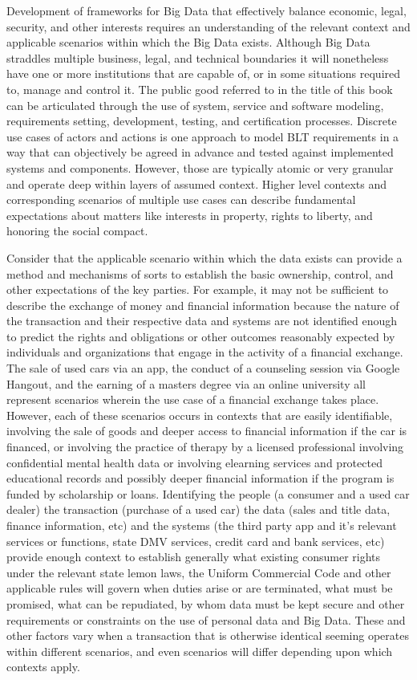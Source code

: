 Development of frameworks for Big Data that effectively balance economic, legal, security, and other interests requires an understanding of the relevant context and applicable scenarios within which the Big Data exists.
Although Big Data straddles multiple business, legal, and technical boundaries it will nonetheless have one or more institutions that are capable of, or in some situations required to, manage and control it.
The public good referred to in the title of this book can be articulated through the use of system, service and software modeling, requirements setting, development, testing, and certification processes. 
Discrete use cases of actors and actions is one approach to model BLT requirements in a way that can objectively be agreed in advance and tested against implemented systems and components.
However, those are typically atomic or very granular and operate deep within layers of assumed context.
Higher level contexts and corresponding scenarios of multiple use cases can describe fundamental expectations about matters like interests in property, rights to liberty, and honoring the social compact. 

Consider that the applicable scenario within which the data exists can provide a method and mechanisms of sorts to establish the basic ownership, control, and other expectations of the key parties.
For example, it may not be sufficient to describe the exchange of money and financial information because the nature of the transaction and their respective data and systems are not identified enough to predict the rights and obligations or other outcomes reasonably expected by individuals and organizations that engage in the activity of a financial exchange.
The sale of used cars via an app, the conduct of a counseling session via Google Hangout, and the earning of a masters degree via an online university all represent scenarios wherein the use case of a financial exchange takes place.
However, each of these scenarios occurs in contexts that are easily identifiable, involving the sale of goods and deeper access to financial information if the car is financed, or involving the practice of therapy by a licensed professional involving confidential mental health data or involving elearning services and protected educational records and possibly deeper financial information if the program is funded by scholarship or loans.
Identifying the people (a consumer and a used car dealer) the transaction (purchase of a used car) the data (sales and title data, finance information, etc) and the systems (the third party app and it's relevant services or functions, state DMV services, credit card and bank services, etc) provide enough context to establish generally what existing consumer rights under the relevant state lemon laws, the Uniform Commercial Code and other applicable rules will govern when duties arise or are terminated, what must be promised, what can be repudiated, by whom data must be kept secure and other requirements or constraints on the use of personal data and Big Data.
These and other factors vary when a transaction that is otherwise identical seeming operates within different scenarios, and even scenarios will differ depending upon which contexts apply.  


